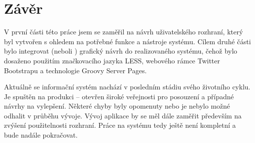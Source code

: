 \chapter{Závěr}

V první části této práce jsem se zaměřil na návrh uživatelského rozhraní, který byl vytvořen s ohledem na potřebné funkce a nástroje systému. Cílem druhé části bylo integrovat (neboli ) grafický návrh do realizovaného systému, čehož bylo dosaženo použitím značkovacího jazyka LESS, webového rámce Twitter Bootstrapu a technologie Groovy Server Pages.

Aktuálně se informační systém nachází v posledním stádiu svého životního cyklu. Je spuštěn na produkci -- otevřen široké veřejnosti pro posouzení a případné návrhy na vylepšení. Některé chyby byly opomenuty nebo je nebylo možné odhalit v průběhu vývoje. Vývoj aplikace by se měl dále zaměřit především na zvýšení použitelnosti rozhraní. Práce na systému tedy ještě není kompletní a bude nadále pokračovat.
